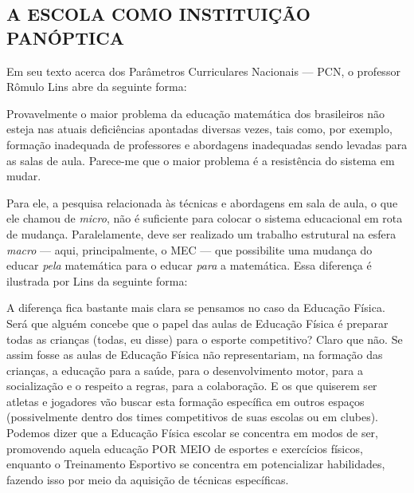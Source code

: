 \documentclass[
  12pt,
  letterpaper,
  DIV=11,
  numbers=noendperiod]{scrartcl}
\newenvironment{citacao}
    {\begin{quoting}[rightmargin=0cm,leftmargin=4cm]
    \begin{singlespace}
    \footnotesize
    }
    {\end{singlespace}
    \end{quoting}
}
\begin{document}
\hypertarget{a-escola-como-instituiuxe7uxe3o-panuxf3ptica}{%
\subsection*{A ESCOLA COMO INSTITUIÇÃO
PANÓPTICA}\label{a-escola-como-instituiuxe7uxe3o-panuxf3ptica}}

Em seu texto acerca dos Parâmetros Curriculares Nacionais --- PCN, o
professor Rômulo Lins abre da seguinte forma:

\begin{citacao}
Provavelmente o maior problema da educação matemática dos brasileiros não esteja nas atuais deficiências apontadas diversas vezes, tais como, por exemplo, formação inadequada de professores e abordagens inadequadas sendo levadas para as salas de aula. Parece-me que o maior
problema é a resistência do sistema em mudar. \citep{lins}
\end{citacao}

Para ele, a pesquisa relacionada às técnicas e abordagens em sala de
aula, o que ele chamou de \emph{micro}, não é suficiente para colocar o
sistema educacional em rota de mudança. Paralelamente, deve ser
realizado um trabalho estrutural na esfera \emph{macro} --- aqui,
principalmente, o MEC --- que possibilite uma mudança do educar
\emph{pela} matemática para o educar \emph{para} a matemática. Essa
diferença é ilustrada por Lins da seguinte forma:

\begin{citacao}
A diferença fica bastante mais clara se pensamos no caso da Educação Física. Será que alguém concebe que o papel das aulas de Educação Física é preparar todas as crianças (todas, eu disse) para o esporte competitivo? Claro que não. Se assim fosse as aulas de Educação Física não representariam, na formação das crianças, a educação para a saúde, para o desenvolvimento motor, para a socialização e o respeito a regras, para a colaboração. E os que quiserem ser atletas e jogadores vão buscar esta formação específica em outros espaços (possivelmente dentro dos times competitivos de suas escolas ou em clubes). Podemos dizer que a Educação Física escolar se concentra em modos de ser, promovendo aquela educação POR MEIO de esportes e exercícios físicos, enquanto o Treinamento Esportivo se concentra em potencializar habilidades, fazendo isso por meio da aquisição de técnicas específicas. \citep{lins}
\end{citacao}
\end{document}
